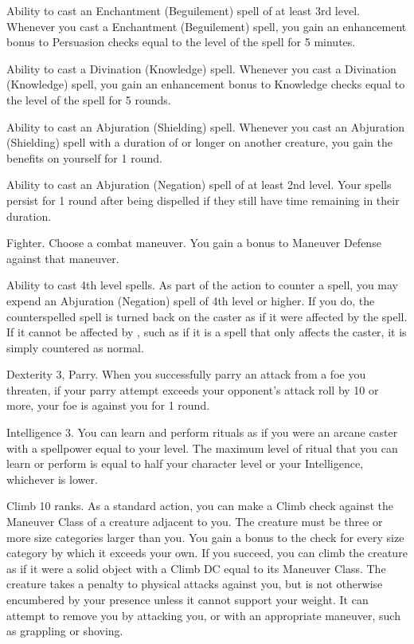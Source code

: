 \featpre Ability to cast an Enchantment (Beguilement) spell of at least 3rd level.
\featben Whenever you cast a Enchantment (Beguilement) spell, you gain an enhancement bonus to Persuasion checks equal to the level of the spell for 5 minutes.

\featpre Ability to cast a Divination (Knowledge) spell.
\featben Whenever you cast a Divination (Knowledge) spell, you gain an enhancement bonus to Knowledge checks equal to the level of the spell for 5 rounds.

\featpre Ability to cast an Abjuration (Shielding) spell.
\featben Whenever you cast an Abjuration (Shielding) spell with a duration of \durshort or longer on another creature, you gain the benefits on yourself for 1 round.

\featpre Ability to cast an Abjuration (Negation) spell of at least 2nd level.
\featben Your spells persist for 1 round after being dispelled if they still have time remaining in their duration.

\featpre Fighter.
\featben Choose a combat maneuver.
You gain a  bonus to Maneuver Defense against that maneuver.

\featpres
Ability to cast 4th level spells.
\featben As part of the action to counter a spell, you may expend an Abjuration (Negation) spell of 4th level or higher.
If you do, the counterspelled spell is turned back on the caster as if it were affected by the 
spell.
If it cannot be affected by , such as if it is a spell that only affects the caster, it is simply countered as normal.

\featpres Dexterity 3, Parry.
\featben When you successfully parry an attack from a foe you threaten, if your parry attempt exceeds your opponent's attack roll by 10 or more, your foe is  against you for 1 round.

\featpre Intelligence 3.
\featben You can learn and perform rituals as if you were an arcane caster with a spellpower equal to your level.
The maximum level of ritual that you can learn or perform is equal to half your character level or your Intelligence, whichever is lower.

\featpre Climb 10 ranks.
\featben As a standard action, you can make a Climb check against the Maneuver Class of a creature adjacent to you.
The creature must be three or more size categories larger than you.
You gain a  bonus to the check for every size category by which it exceeds your own.
If you succeed, you can climb the creature as if it were a solid object with a Climb DC equal to its Maneuver Class.
The creature takes a  penalty to physical attacks against you, but is not otherwise encumbered by your presence unless it cannot support your weight.
It can attempt to remove you by attacking you, or with an appropriate maneuver, such as grappling or shoving.

